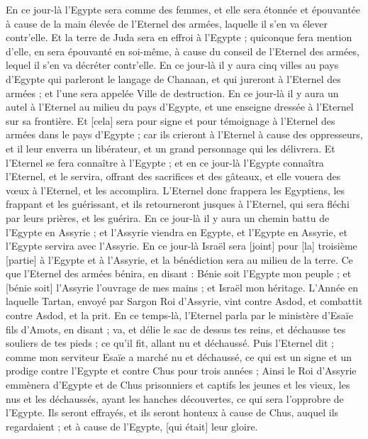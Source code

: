 \begin{multicols}{2}
En ce jour-là l'Egypte sera comme des femmes, et elle sera étonnée et épouvantée à cause de la main élevée de l'Eternel des armées, laquelle il s'en va élever contr'elle.
Et la terre de Juda sera en effroi à l'Egypte ; quiconque fera mention d'elle, en sera épouvanté en soi-même, à cause du conseil de l'Eternel des armées, lequel il s'en va décréter contr'elle.
En ce jour-là il y aura cinq villes au pays d'Egypte qui parleront le langage de Chanaan, et qui jureront à l'Eternel des armées ; et l'une sera appelée Ville de destruction.
En ce jour-là il y aura un autel à l'Eternel au milieu du pays d'Egypte, et une enseigne dressée à l'Eternel sur sa frontière.
Et [cela] sera pour signe et pour témoignage à l'Eternel des armées dans le pays d'Egypte ; car ils crieront à l'Eternel à cause des oppresseurs, et il leur enverra un libérateur, et un grand personnage qui les délivrera.
Et l'Eternel se fera connaître à l'Egypte ; et en ce jour-là l'Egypte connaîtra l'Eternel, et le servira, offrant des sacrifices et des gâteaux, et elle vouera des vœux à l'Eternel, et les accomplira.
L'Eternel donc frappera les Egyptiens, les frappant et les guérissant, et ils retourneront jusques à l'Eternel, qui sera fléchi par leurs prières, et les guérira.
En ce jour-là il y aura un chemin battu de l'Egypte en Assyrie ; et l'Assyrie viendra en Egypte, et l'Egypte en Assyrie, et l'Egypte servira avec l'Assyrie.
En ce jour-là Israël sera [joint] pour [la] troisième [partie] à l'Egypte et à l'Assyrie, et la bénédiction sera au milieu de la terre.
Ce que l'Eternel des armées bénira, en disant : Bénie soit l'Egypte mon peuple ; et [bénie soit] l'Assyrie l'ouvrage de mes mains ; et Israël mon héritage.
\VerseOne{}L'Année en laquelle Tartan, envoyé par Sargon Roi d'Assyrie, vint contre Asdod, et combattit contre Asdod, et la prit.
En ce temps-là, l'Eternel parla par le ministère d'Esaïe fils d'Amots, en disant ; va, et délie le sac de dessus tes reins, et déchausse tes souliers de tes pieds ; ce qu'il fit, allant nu et déchaussé.
Puis l'Eternel dit ; comme mon serviteur Esaïe a marché nu et déchaussé, ce qui est un signe et un prodige contre l'Egypte et contre Chus pour trois années ;
Ainsi le Roi d'Assyrie emmènera d'Egypte et de Chus prisonniers et captifs les jeunes et les vieux, les nus et les déchaussés, ayant les hanches découvertes, ce qui sera l'opprobre de l'Egypte.
Ils seront effrayés, et ils seront honteux à cause de Chus, auquel ils regardaient ; et à cause de l'Egypte, [qui était] leur gloire.

\end{multicols}

